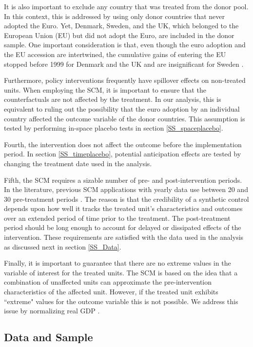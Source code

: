 \documentclass[12pt]{article}
\begin{document}
It is also important to exclude any country that was treated from the donor pool. In this context, this is addressed by using only donor countries that never adopted the Euro. Yet, Denmark, Sweden, and the UK, which belonged to the European Union (EU) but did not adopt the Euro, are included in the donor sample. One important consideration is that, even though the euro adoption and the EU accession are intertwined, the cumulative gains of entering the EU stopped before 1999 for Denmark and the UK and are insignificant for Sweden \citep{Campos2018}. 

Furthermore, policy interventions frequently have spillover effects on non-treated units. When employing the SCM, it is important to ensure that the counterfactuals are not affected by the treatment. In our analysis, this is equivalent to ruling out the possibility that the euro adoption by an individual country affected the outcome variable of the donor countries. This assumption is tested by performing in-space placebo tests in section \ref{SS_spaceplacebo}.

Fourth, the intervention does not affect the outcome before the implementation period. In section \ref{SS_timeplacebo}, potential anticipation effects are tested by changing the treatment date used in the analysis.

Fifth, the SCM requires a sizable number of pre- and post-intervention periods. In the literature, previous SCM applications with yearly data use between 20 \citep{Abadie2003} and 30 pre-treatment periods \citep{Abadie2015}. The reason is that the credibility of a synthetic control depends upon how well it tracks the treated unit’s characteristics and outcomes over an extended period of time prior to the treatment. The post-treatment period should be long enough to account for delayed or dissipated effects of the intervention. These requirements are satisfied with the data used in the analysis as discussed next in section \ref{SS_Data}.

Finally, it is important to guarantee that there are no extreme values in the variable of interest for the treated units. The SCM is based on the idea that a combination of unaffected units can approximate the pre-intervention characteristics of the affected unit. However, if the treated unit exhibits ``extreme" values for the outcome variable this is not possible. We address this issue by normalizing real GDP \citep{Born2018}.  


\subsection{Data and Sample \label{SS_Data}}
\end{document}
